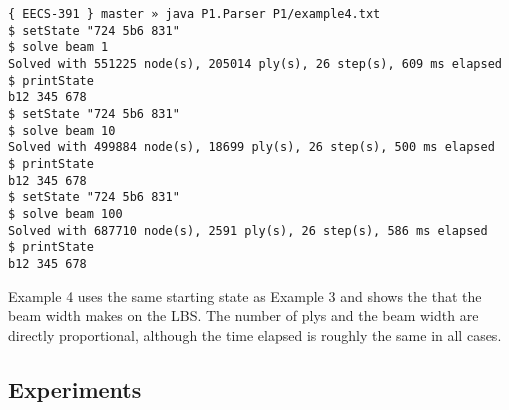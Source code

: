 \documentclass[letterpaper]{article}
\begin{document}
\begin{verbatim}
{ EECS-391 } master » java P1.Parser P1/example4.txt
$ setState "724 5b6 831"
$ solve beam 1
Solved with 551225 node(s), 205014 ply(s), 26 step(s), 609 ms elapsed
$ printState
b12 345 678
$ setState "724 5b6 831"
$ solve beam 10
Solved with 499884 node(s), 18699 ply(s), 26 step(s), 500 ms elapsed
$ printState
b12 345 678
$ setState "724 5b6 831"
$ solve beam 100
Solved with 687710 node(s), 2591 ply(s), 26 step(s), 586 ms elapsed
$ printState
b12 345 678
\end{verbatim}

Example 4 uses the same starting state as Example 3 and shows the 
that the beam width makes on the LBS. The number of plys and the
beam width are directly proportional, although the time elapsed is
roughly the same in all cases.

\subsection*{Experiments}
\end{document}
